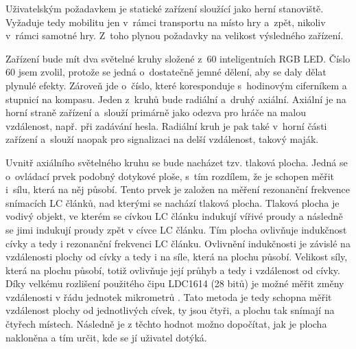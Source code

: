 
Uživatelským požadavkem je statické zařízení sloužící jako herní stanoviště.
Vyžaduje tedy mobilitu jen v~rámci transportu na místo hry a~zpět, nikoliv v~rámci samotné hry.
Z~toho plynou požadavky na velikost výsledného zařízení.

Zařízení bude mít dva světelné kruhy složené z~60 inteligentních RGB LED.
Číslo 60 jsem zvolil, protože se jedná o~dostatečně jemné dělení, aby se daly dělat plynulé efekty.
Zároveň jde o~číslo, které koresponduje s~hodinovým ciferníkem a stupnicí na kompasu.
Jeden z~kruhů bude radiální a~druhý axiální.
Axiální je na horní straně zařízení a~slouží primárně jako odezva pro hráče na malou vzdálenost, např. při zadávání hesla.
Radiální kruh je pak také v~horní části zařízení a~slouží naopak pro signalizaci na delší vzdálenost, takový maják.

Uvnitř axiálního světelného kruhu se bude nacházet tzv. tlaková plocha.
\label{popisTlakovky} Jedná se o~ovládací prvek podobný dotykové ploše, s~tím rozdílem, že je schopen měřit i~sílu, která na něj působí.
Tento prvek je založen na měření rezonanční frekvence snímacích LC článků, nad kterými se nachází tlaková plocha.
Tlaková plocha je vodivý objekt, ve kterém se cívkou LC článku indukují vířivé proudy a následně se jimi indukují proudy zpět v cívce LC článku.
Tím plocha ovlivňuje indukčnost cívky a tedy i rezonanční frekvenci LC článku.
Ovlivnění indukčnosti je závislé na vzdálenosti plochy od cívky a tedy i na síle, která na plochu působí.
Velikost síly, která na plochu působí, totiž ovlivňuje její průhyb a tedy i vzdálenost od cívky.
Díky velkému rozlišení použitého čipu LDC1614 \cite{LDC1614} (28 bitů) je možné měřit změny vzdálenosti v řádu jednotek mikrometrů \cite{LDC1614LinearPositionSensing}.
Tato metoda je tedy schopna měřit vzdálenost plochy od jednotlivých cívek, ty jsou čtyři, a plochu tak snímají na čtyřech místech.
Následně je z těchto hodnot možno dopočítat, jak je plocha nakloněna a tím určit, kde se jí uživatel dotýká.

